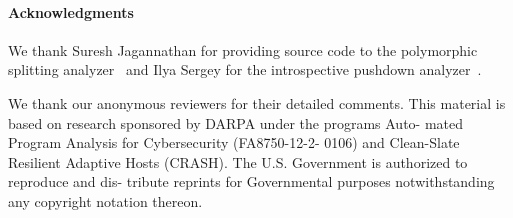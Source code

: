 \documentclass[preprint,onecolumn,9pt]{sigplanconf} %
\begin{document}



\paragraph{Acknowledgments}

We thank Suresh Jagannathan for providing source code to the
polymorphic splitting
analyzer~\cite{dvanhorn:wright-jagannathan-toplas98} and Ilya Sergey
for the introspective pushdown
analyzer~\cite{dvanhorn:Earl2012Introspective}.

We thank our anonymous reviewers for their detailed comments. This
material is based on research sponsored by DARPA under the programs
Auto- mated Program Analysis for Cybersecurity (FA8750-12-2- 0106) and
Clean-Slate Resilient Adaptive Hosts (CRASH).  The U.S. Government is
authorized to reproduce and dis- tribute reprints for Governmental
purposes notwithstanding any copyright notation thereon.


\balance

%



% 
\end{document}
